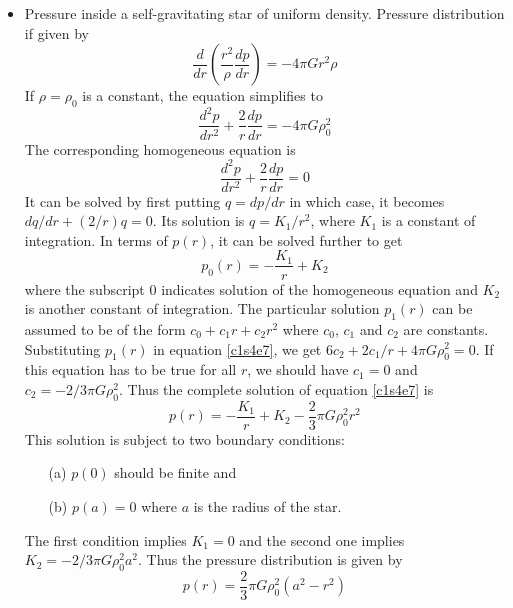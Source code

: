 \begin{itemize}
\item Pressure inside a self-gravitating star of uniform density. Pressure distribution if given by
\[
\frac{d}{dr}\left(\frac{r^2}{\rho}\frac{dp}{dr}\right) = -4\pi Gr^2\rho
\]
If $\rho=\rho_0$ is a constant, the equation simplifies to
\begin{equation}\label{c1s4e7}
\frac{d^2p}{dr^2} + \frac{2}{r}\frac{dp}{dr} = -4\pi G\rho_0^2
\end{equation}
The corresponding homogeneous equation is
\[
\frac{d^2p}{dr^2} + \frac{2}{r}\frac{dp}{dr} = 0
\]
It can be solved by first putting $q=dp/dr$ in which case, it becomes $dq/dr + (2/r)q=0$. Its solution is $q=K_1/r^2$, where $K_1$ is a constant of integration. In terms of 
$p(r)$, it can be solved further to get
\[
p_0(r) = -\frac{K_1}{r} + K_2
\]
where the subscript $0$ indicates solution of the homogeneous equation and $K_2$ is another constant of integration. The particular solution $p_1(r)$ can be assumed to be of the form
$c_0 + c_1r + c_2r^2$ where $c_0$, $c_1$ and $c_2$ are constants. Substituting $p_1(r)$ in equation \eqref{c1s4e7}, we get $6c_2 + 2c_1/r + 4\pi G\rho_0^2 = 0$. If this equation has to
be true for all $r$, we should have $c_1 = 0$ and $c_2 = -2/3 \pi G\rho_0^2$. Thus the complete solution of equation \eqref{c1s4e7} is
\[
p(r) = -\frac{K_1}{r} + K_2 -\frac{2}{3}\pi G\rho_0^2 r^2
\]
This solution is subject to two boundary conditions:
\begin{itemize}
\item[(a)] $p(0)$ should be finite and 
\item[(b)] $p(a) = 0$ where $a$ is the radius of the star.
\end{itemize}
The first condition implies $K_1 = 0$ and the second one implies $K_2 = -2/3 \pi G\rho_0^2 a^2$. Thus the pressure distribution is given by
\[
p(r) = \frac{2}{3}\pi G\rho_0^2 (a^2 - r^2)
\]


\end{itemize}

